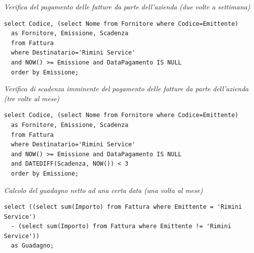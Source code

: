 \noindent{}
\newline\newline

\noindent\textit{Verifica del pagamento delle fatture da parte dell'azienda (due volte a settimana)}
\begin{verbatim}
select Codice, (select Nome from Fornitore where Codice=Emittente)
  as Fornitore, Emissione, Scadenza
  from Fattura
  where Destinatario='Rimini Service'
  and NOW() >= Emissione and DataPagamento IS NULL
  order by Emissione;
\end{verbatim}
\vspace{0.5cm}

\noindent{}
\newline\newline

\noindent\textit{Verifica di scadenza imminente del pagamento delle fatture da parte dell'azienda (tre volte al mese)}
\begin{verbatim}
select Codice, (select Nome from Fornitore where Codice=Emittente)
  as Fornitore, Emissione, Scadenza
  from Fattura
  where Destinatario='Rimini Service'
  and NOW() >= Emissione and DataPagamento IS NULL
  and DATEDIFF(Scadenza, NOW()) < 3
  order by Emissione;
\end{verbatim}
\vspace{0.5cm}

\noindent{}
\newline\newline

\noindent\textit{Calcolo del guadagno netto ad una certa data (una volta al mese)}
\begin{verbatim}
select ((select sum(Importo) from Fattura where Emittente = 'Rimini Service')
  - (select sum(Importo) from Fattura where Emittente != 'Rimini Service'))
  as Guadagno;
\end{verbatim}
\vspace{0.5cm}

